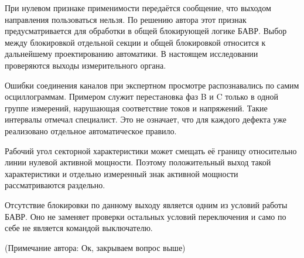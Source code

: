 При нулевом признаке применимости передаётся сообщение,
что выходом направления пользоваться нельзя. По решению автора
этот признак предусматривается для обработки в общей блокирующей
логике БАВР. Выбор между блокировкой отдельной секции и общей
блокировкой относится к дальнейшему проектированию автоматики.
В настоящем исследовании проверяются выходы измерительного органа.

Ошибки соединения каналов при экспертном просмотре распознавались
по самим осциллограммам. Примером служит перестановка фаз B и C
только в одной группе измерений, нарушающая соответствие токов
и напряжений. Такие интервалы отмечал специалист. Это не означает,
что для каждого дефекта уже реализовано отдельное автоматическое правило.

Рабочий угол секторной характеристики
может смещать её границу относительно
линии нулевой активной мощности.
Поэтому положительный выход такой характеристики
и отдельно измеренный знак активной мощности
рассматриваются раздельно.

Отсутствие блокировки по данному выходу
является одним из условий работы БАВР.
Оно не заменяет проверки остальных условий
переключения и само по себе
не является командой выключателю.

\iffalse
\ifdefined\AuthorReview
\par\smallskip\begingroup\small\raggedright\color{red!60!black}
\noindent\textbf{Примечание рецензента [R5-02], физическая постановка.} Нужно определить смысл выхода неприменимости для внешней логики БАВР: сохраняется блокировка, используется другой орган либо решение передаётся отдельной логике. Сейчас описаны прямое и нулевое состояния, но действие при VALID=0 остаётся открытым. Самостоятельно выбирать его нельзя. Достаточно согласованного автором объяснения или явной границы, что здесь проверяется измерительный орган, а правило обработки его отказа ещё не задано. Это влияет и на инженерную трактовку «лишнего отказа».\par\endgroup\smallskip
\fi
\ifdefined\AuthorReview
\par{}\smallskip
\fi
(Примечание автора: Ок, закрываем вопрос выше) 
\fi

